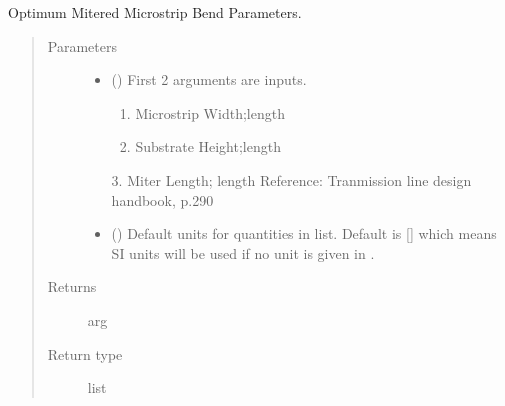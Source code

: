 \documentclass[letterpaper,10pt,english]{sphinxmanual}
\begin{document}

\begin{fulllineitems}
\label{\detokenize{components:components.OptimumMitered90DegMicrostripBend}}
Optimum Mitered Microstrip Bend Parameters.
\begin{quote}\begin{description}
\item[{Parameters}] \leavevmode\begin{itemize}
\item {} 
 () \textendash{} 
First 2 arguments are inputs.
\begin{enumerate}
%
\item {} 
Microstrip Width;length

\item {} 
Substrate Height;length

\end{enumerate}

3.  Miter Length; length
Reference: Tranmission line design handbook, p.290


\item {} 
 (\sphinxstyleliteralemphasis{\sphinxupquote{, }}) \textendash{} Default units for quantities in  list. Default is {[}{]} which means SI units will be used if no unit is given in .

\end{itemize}

\item[{Returns}] \leavevmode
arg

\item[{Return type}] \leavevmode
list

\end{description}\end{quote}

\end{fulllineitems}
\end{document}
